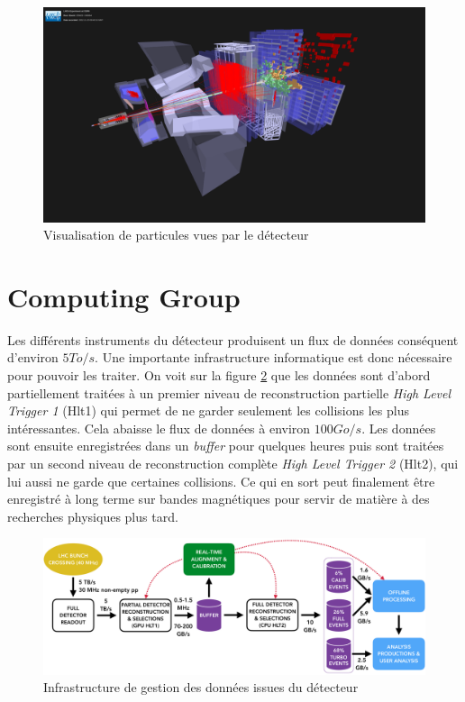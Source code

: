 \documentclass[a4paper,11pt]{report}
\begin{document}
\begin{figure}[H]
    \includegraphics[width=\textwidth, center]{LHCb_3D.png}
    \caption{Visualisation de particules vues par le détecteur}
    \label{LHCb_3D}
\end{figure}

\section{Computing Group}
Les différents instruments du détecteur produisent un flux de données conséquent d'environ $5 To/s$.
Une importante infrastructure informatique est donc nécessaire pour pouvoir les traiter.
On voit sur la figure \ref{LHCb_stack} que les données sont d'abord partiellement traitées à un premier niveau de reconstruction partielle \emph{High Level Trigger 1} (Hlt1) qui permet de ne garder seulement les collisions les plus intéressantes.
Cela abaisse le flux de données à environ $100 Go/s$.
Les données sont ensuite enregistrées dans un \emph{buffer} pour quelques heures puis sont traitées par un second niveau de reconstruction complète \emph{High Level Trigger 2} (Hlt2), qui lui aussi ne garde que certaines collisions.
Ce qui en sort peut finalement être enregistré à long terme sur bandes magnétiques pour servir de matière à des recherches physiques plus tard.

\begin{figure}[H]
    \includegraphics[width=\textwidth, center]{LHCb_stack.png}
    \caption{Infrastructure de gestion des données issues du détecteur}
    \label{LHCb_stack}
\end{figure}
\end{document}
